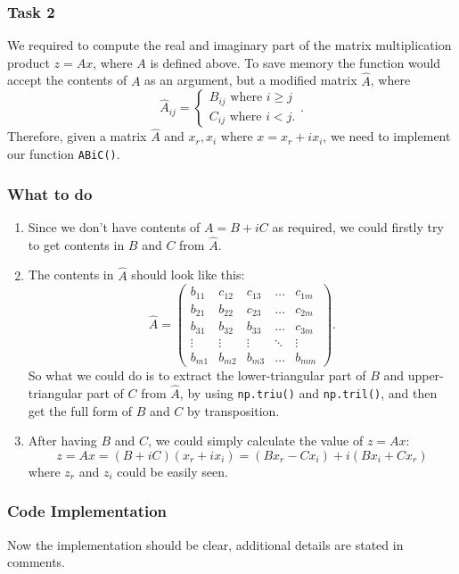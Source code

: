 \subsubsection*{Task 2}%
We required to compute the real and imaginary part of the matrix multiplication product $z = Ax$, where  $A$ is defined above. To save memory the function would accept the contents of $A$ as an argument, but a modified matrix $\hat{A}$, where
\[
\hat{A}_{ij} = \left\{
  \begin{array}{l}
  B_{ij} \text{ where } i \ge j \\
  C_{ij} \text{ where } i < j.
  \end{array}
\right.
.\] 
Therefore, given a matrix $\hat{A}$ and $x_r, x_i$ where  $x = x_r + ix_i$, we need to implement our function \texttt{ABiC()}.
\subsubsection*{What to do}
\begin{enumerate}
\item Since we don't have contents of $A = B + iC$ as required, we could firstly try to get contents in $B$ and $C$ from $\hat{A}$.
\item The contents in $\hat{A}$ should look like this:
  \[
    \hat{A} = \begin{pmatrix} 
      b_{11} & c_{12} & c_{13} & \ldots & c_{1m} \\
      b_{21} & b_{22} & c_{23} & \ldots & c_{2m} \\
      b_{31} & b_{32} & b_{33} & \ldots & c_{3m} \\
      \vdots & \vdots & \vdots & \ddots & \vdots \\ 
      b_{m1} & b_{m2} & b_{m3} & \ldots & b_{mm}
    \end{pmatrix} 
  .\]
  So what we could do is to extract the lower-triangular part of $B$ and upper-triangular part of $C$ from $\hat{A}$, by using \texttt{np.triu()} and \texttt{np.tril()}, and then get the full form of $B$ and  $C$ by transposition.
 \item After having $B$ and $C$, we could simply calculate the value of  $z = Ax$:
    \[
      z = Ax = (B + iC)(x_r + ix_i) = (Bx_r - Cx_i) + i(Bx_i + Cx_r)
   \]
   where $z_r$ and $z_i$ could be easily seen.
\end{enumerate}
\subsubsection*{Code Implementation}%
Now the implementation should be clear, additional details are stated in comments.

